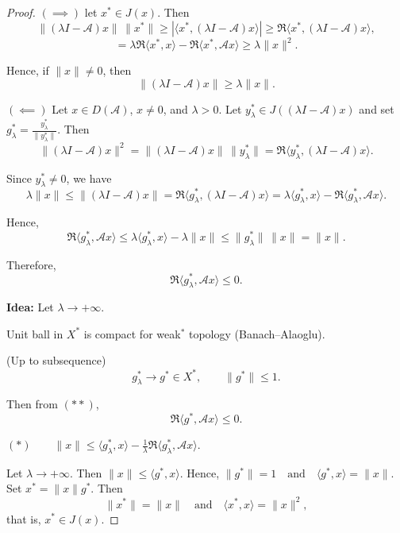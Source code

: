 \documentclass[12pt, oneside]{book}
\begin{document}
\begin{proof}
	$(\implies)$ let $x^* \in J(x)$. Then
\[
\|(\lambda I - \mathscr{A})x\| \, \|x^*\|
\ge \left| \langle x^*, (\lambda I - \mathscr{A})x \rangle \right|
\ge \Re \langle x^*, (\lambda I - \mathscr{A})x \rangle,
\]
\[
= \lambda \Re \langle x^*, x \rangle - \Re \langle x^*, \mathscr{A}x \rangle
\ge \lambda \|x\|^2.
\]

Hence, if $\|x\| \neq 0$, then
\[
\|(\lambda I - \mathscr{A})x\| \ge \lambda \|x\|.
\]

\medskip

$(\impliedby)$ Let $x \in D(\mathscr{A})$, $x \neq 0$, and $\lambda > 0$.
Let $y_\lambda^* \in J((\lambda I - \mathscr{A})x)$ and set
$
g_\lambda^* = \frac{y_\lambda^*}{\|y_\lambda^*\|}.
$ Then
\[
\|(\lambda I - \mathscr{A})x\|^2
= \|(\lambda I - \mathscr{A})x\| \, \|y_\lambda^*\|
= \Re \langle y_\lambda^*, (\lambda I - \mathscr{A})x \rangle.
\]

Since $y_\lambda^* \neq 0$, we have
\[
\lambda\|x\|\leq \|(\lambda I - \mathscr{A})x\|
= \Re \langle g_\lambda^*, (\lambda I - \mathscr{A})x \rangle
= \lambda \langle g_\lambda^*, x \rangle
- \Re \langle g_\lambda^*, \mathscr{A}x \rangle.
\]

Hence,
\[
\Re \langle g_\lambda^*, \mathscr{A}x \rangle
\le \lambda \langle g_\lambda^*, x \rangle - \lambda\|x\|
\le \|g_\lambda^*\| \, \|x\| = \|x\|.
\]

Therefore,
\[
\Re \langle g_\lambda^*, \mathscr{A}x \rangle \le 0. \tag{**}
\]

\medskip

\textbf{Idea:} Let $\lambda \to +\infty$.

\medskip

Unit ball in $X^*$ is compact for weak$^*$ topology
(Banach--Alaoglu).

\medskip

(Up to subsequence)
\[
g_\lambda^* \longrightarrow g^* \in X^*,
\qquad \|g^*\| \le 1.
\]

\medskip

Then from $(**)$,
\[
\Re \langle g^*, \mathscr{A}x \rangle \le 0.
\]

\medskip

$(*) \qquad
\|x\| \le \langle g_\lambda^*, x \rangle
- \frac{1}{\lambda} \Re \langle g_\lambda^*, \mathscr{A}x \rangle.
$

\medskip

Let $\lambda \to +\infty$. Then
$
\|x\| \le \langle g^*, x \rangle.
$
Hence,
$
\|g^*\| = 1
\quad \text{and} \quad
\langle g^*, x \rangle = \|x\|.
$\\
Set $x^* = \|x\| g^*$.
Then
\[
\|x^*\| = \|x\|
\quad \text{and} \quad
\langle x^*, x \rangle = \|x\|^2,
\]
that is,
$
x^* \in J(x).
$	
\end{proof}
\end{document}
